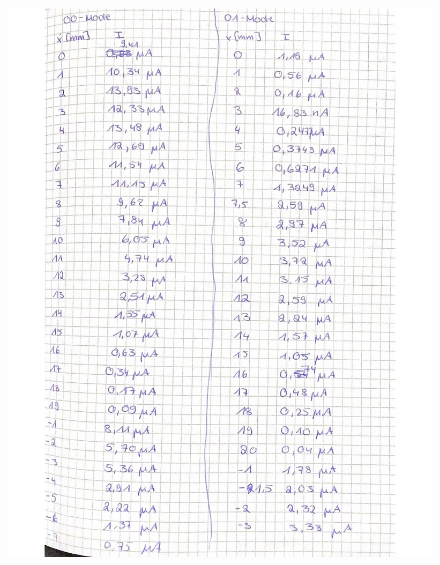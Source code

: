 \begin{figure}[H]
  \centering
  \includegraphics[width=\textwidth]{"Messwerte/V61Messdaten_02.pdf"}
  \label{fig:Messungen_2}
\end{figure}

